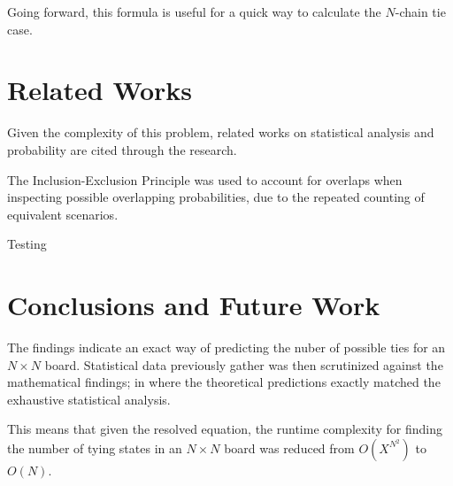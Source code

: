 \documentclass[12pt]{article}
\theoremstyle{definition}
\theoremstyle{theorem}
\begin{document}
Going forward, this formula is useful for a quick way to calculate the $N$-chain tie case.

\section{Related Works}

Given the complexity of this problem, related works on statistical analysis and probability are cited through the research.

The Inclusion-Exclusion Principle \cite{iep} was used to account for overlaps when inspecting possible overlapping probabilities, due to the repeated counting of equivalent scenarios.

Testing

\section{Conclusions and Future Work}

The findings indicate an exact way of predicting the nuber of possible ties for an $N \times N$ board. Statistical data previously gather was then scrutinized against the mathematical findings; in where the theoretical predictions exactly matched the exhaustive statistical analysis.

This means that given the resolved equation, the runtime complexity for finding the number of tying states in an $N \times N$ board was reduced from $O(X^{N^2})$ to $O(N)$.

\printbibliography
\end{document}
